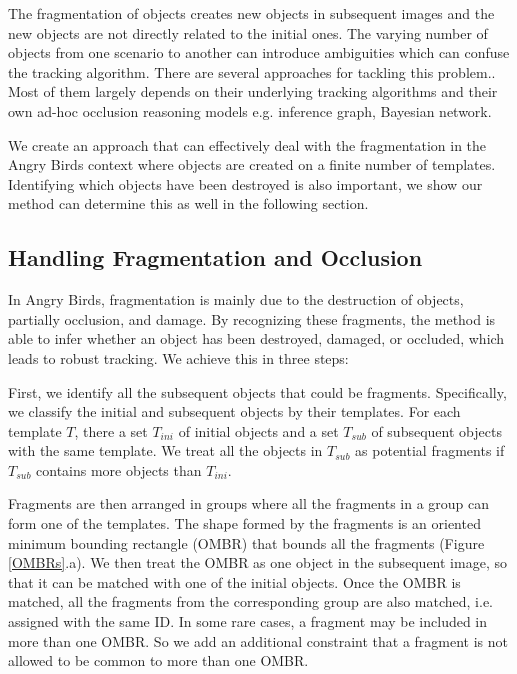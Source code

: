 \documentclass[letterpaper]{article}
\begin{document}
The fragmentation of objects creates new objects in subsequent images and the new objects are not directly related to the initial ones. The varying number of objects from one scenario to another can introduce ambiguities which can confuse the tracking algorithm. There are several approaches for tackling this problem.\cite{Occlusion1,Occlusion2,Occlusion3}. Most of them largely depends on their underlying tracking algorithms and their own ad-hoc occlusion reasoning models e.g. inference graph, Bayesian network. 

We create an approach that can effectively deal with the fragmentation in the Angry Birds context where objects are created on a finite number of templates. 
Identifying which objects have been destroyed is also important, we show our method can determine this as well in the following section.   

\subsection{Handling Fragmentation and Occlusion}
 
In Angry Birds, fragmentation is mainly due to the destruction of objects, partially occlusion, and damage. By recognizing these fragments, the method is able to infer whether an object has been destroyed, damaged, or occluded, which leads to robust tracking. We achieve this in three steps:

First, we identify all the subsequent objects that could be fragments. Specifically, we classify the initial and subsequent objects by their templates. For each template $T$, there a set $T_{ini}$ of initial objects and a set  $T_{sub}$ of subsequent objects with the same template. We treat all the objects in $T_{sub}$ as potential fragments if $T_{sub}$ contains more objects than $T_{ini}$.

Fragments are then arranged in groups where all the fragments in a group can form one of the templates. The shape formed by the fragments is an oriented minimum bounding rectangle (OMBR) that bounds all the fragments (Figure \ref{OMBRs}.a). We then treat the OMBR as one object in the subsequent image, so that it can be matched with one of the initial objects.  Once the OMBR is matched, all the fragments from the corresponding group are also matched, i.e. assigned with the same ID. In some rare cases, a fragment may be included in more than one OMBR. So we add an additional constraint that a fragment is not allowed to be common to more than one OMBR.
\end{document}
